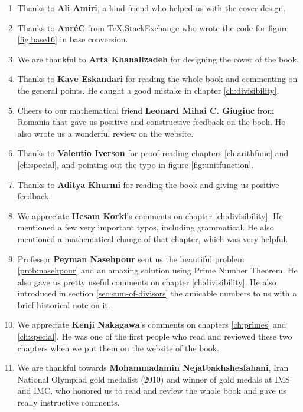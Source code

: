\documentclass[leqno,12pt]{book}
\begin{document}
	\begin{enumerate}
		\item Thanks to \textbf{Ali Amiri}, a kind friend who helped us with the cover design.
		\item Thanks to \textbf{Anr\'{e}C} from TeX.StackExchange who wrote the code for figure \eqref{fig:base16} in base conversion.
		\item We are thankful to \textbf{Arta Khanalizadeh} for designing the cover of the book.
		\item Thanks to \textbf{Kave Eskandari} for reading the whole book and commenting on the general points. He caught a good mistake in chapter \ref{ch:divisibility}.
		\item Cheers to our mathematical friend \textbf{Leonard Mihai C. Giugiuc} from Romania that gave us positive and constructive feedback on the book. He also wrote us a wonderful review on the website.

		\item Thanks to \textbf{Valentio Iverson} for proof-reading chapters \ref{ch:arithfunc} and \ref{ch:special}, and pointing out the typo in figure \eqref{fig:unitfunction}.

		\item Thanks to \textbf{Aditya Khurmi} for reading the book and giving us positive feedback.

		\item We appreciate \textbf{Hesam Korki}'s comments on chapter \ref{ch:divisibility}. He mentioned a few very important typos, including grammatical. He also mentioned a mathematical change of that chapter, which was very helpful.

		\item Professor \textbf{Peyman Nasehpour} sent us the beautiful problem \eqref{prob:nasehpour} and an amazing solution using Prime Number Theorem. He also gave us pretty useful comments on chapter \ref{ch:divisibility}. He also introduced in section \eqref{sec:sum-of-divisors} the amicable numbers to us with a brief historical note on it.

		\item We appreciate \textbf{Kenji Nakagawa}'s comments on chapters \ref{ch:primes} and \ref{ch:special}. He was one of the first people who read and reviewed these two chapters when we put them on the website of the book.

		\item We are thankful towards \textbf{Mohammadamin Nejatbakhshesfahani}, Iran National Olympiad gold medalist (2010) and winner of gold medals at IMS and IMC, who honored us to read and review the whole book and gave us really instructive comments.


\end{enumerate}
\end{document}
